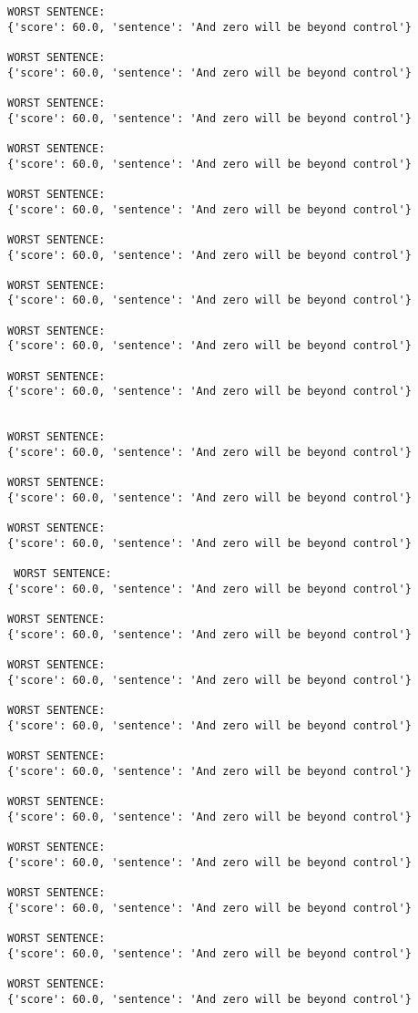 \documentclass[12pt,a4paper,oneside]{book}
\begin{document}
\begin{verbatim}
WORST SENTENCE:
{'score': 60.0, 'sentence': 'And zero will be beyond control'}

WORST SENTENCE:
{'score': 60.0, 'sentence': 'And zero will be beyond control'}

WORST SENTENCE:
{'score': 60.0, 'sentence': 'And zero will be beyond control'}

WORST SENTENCE:
{'score': 60.0, 'sentence': 'And zero will be beyond control'}

WORST SENTENCE:
{'score': 60.0, 'sentence': 'And zero will be beyond control'}

WORST SENTENCE:
{'score': 60.0, 'sentence': 'And zero will be beyond control'}

WORST SENTENCE:
{'score': 60.0, 'sentence': 'And zero will be beyond control'}

WORST SENTENCE:
{'score': 60.0, 'sentence': 'And zero will be beyond control'}

WORST SENTENCE:
{'score': 60.0, 'sentence': 'And zero will be beyond control'}
 
 
WORST SENTENCE:
{'score': 60.0, 'sentence': 'And zero will be beyond control'}

WORST SENTENCE:
{'score': 60.0, 'sentence': 'And zero will be beyond control'}

WORST SENTENCE:
{'score': 60.0, 'sentence': 'And zero will be beyond control'}

 WORST SENTENCE:
{'score': 60.0, 'sentence': 'And zero will be beyond control'}

WORST SENTENCE:
{'score': 60.0, 'sentence': 'And zero will be beyond control'}

WORST SENTENCE:
{'score': 60.0, 'sentence': 'And zero will be beyond control'}

WORST SENTENCE:
{'score': 60.0, 'sentence': 'And zero will be beyond control'}

WORST SENTENCE:
{'score': 60.0, 'sentence': 'And zero will be beyond control'}

WORST SENTENCE:
{'score': 60.0, 'sentence': 'And zero will be beyond control'}

WORST SENTENCE:
{'score': 60.0, 'sentence': 'And zero will be beyond control'}

WORST SENTENCE:
{'score': 60.0, 'sentence': 'And zero will be beyond control'}

WORST SENTENCE:
{'score': 60.0, 'sentence': 'And zero will be beyond control'}

WORST SENTENCE:
{'score': 60.0, 'sentence': 'And zero will be beyond control'}


\end{verbatim}
\end{document}
